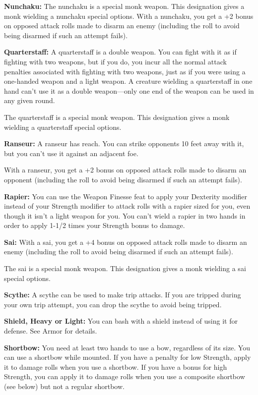 \documentclass{article}
\begin{document}
\textbf{Nunchaku:} The nunchaku is a special monk weapon. This designation gives 
a monk wielding a nunchaku special options. With a nunchaku, you get a +2 bonus 
on opposed attack rolls made to disarm an enemy (including the roll to avoid being 
disarmed if such an attempt fails).

\textbf{Quarterstaff:} A quarterstaff is a double weapon. You can fight with it 
as if fighting with two weapons, but if you do, you incur all the normal attack 
penalties associated with fighting with two weapons, just as if you were using 
a one-handed weapon and a light weapon. A creature wielding a quarterstaff in one 
hand can't use it as a double weapon---only one end of the weapon can be used in 
any given round.

The quarterstaff is a special monk weapon. This designation gives a monk wielding 
a quarterstaff special options.

\textbf{Ranseur:} A ranseur has reach. You can strike opponents 10 feet away with 
it, but you can't use it against an adjacent foe.

With a ranseur, you get a +2 bonus on opposed attack rolls made to disarm an opponent 
(including the roll to avoid being disarmed if such an attempt fails).

\textbf{Rapier: }You can use the Weapon Finesse feat to apply your Dexterity modifier 
instead of your Strength modifier to attack rolls with a rapier sized for you, 
even though it isn't a light weapon for you. You can't wield a rapier in two hands 
in order to apply 1-1/2 times your Strength bonus to damage.

\textbf{Sai:} With a sai, you get a +4 bonus on opposed attack rolls made to disarm 
an enemy (including the roll to avoid being disarmed if such an attempt fails).

The sai is a special monk weapon. This designation gives a monk wielding a sai 
special options.

\textbf{Scythe:} A scythe can be used to make trip attacks. If you are tripped 
during your own trip attempt, you can drop the scythe to avoid being tripped.

\textbf{Shield, Heavy or Light:} You can bash with a shield instead of using it 
for defense. See Armor for details.

\textbf{Shortbow: }You need at least two hands to use a bow, regardless of its 
size. You can use a shortbow while mounted. If you have a penalty for low Strength, 
apply it to damage rolls when you use a shortbow. If you have a bonus for high 
Strength, you can apply it to damage rolls when you use a composite shortbow (see 
below) but not a regular shortbow.
\end{document}
